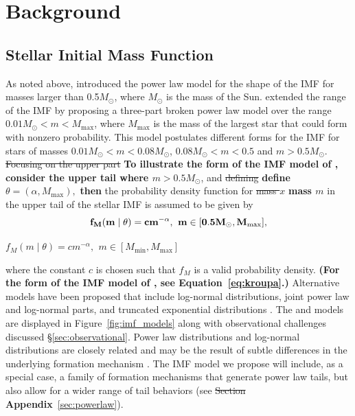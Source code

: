 \documentclass[ejs]{imsart}
\numberwithin{equation}{section}
\theoremstyle{plain}
\newcommand{\new}[1]{{\bf #1}}
\newcommand{\remove}[1]{\st{#1}}
\newcommand{\Msun}{M_{\odot}}
\newcommand{\Mmax}{M_{\text{max}}}
\newcommand{\Mmin}{M_{\text{min}}}
\begin{document}
\section{Background}
\label{sec:background}
\subsection{Stellar Initial Mass Function}

As noted above, \cite{salpeter55} introduced the power law model for the shape of the IMF for masses larger
than 0.5$\Msun$, where $\Msun$ is the mass of the Sun.
\cite{kroupa2001} extended the range of the IMF by proposing a three-part broken power law model 
over the range $0.01 \Msun < m < \Mmax$, where $\Mmax$ is the mass of the largest star that could form with nonzero probability.
This model postulates different forms for the IMF for stars of masses $0.01 \Msun < m < 0.08 \Msun$,
$0.08 \Msun < m < 0.5$ and $m > 0.5\Msun$.
\remove{Focusing on the upper part} \new{To illustrate the form of the IMF model of \cite{salpeter55}, consider the upper tail where $m > 0.5\Msun$}, and \remove{defining} \new{define} $\theta = (\alpha, \Mmax),$ \new{then} the probability density function for \remove{mass $x$} \new{ mass $m$} in the upper tail of the stellar IMF is assumed to be given by
\begin{align}
{\bf	f_M(m \mid \theta) = cm^{-\alpha}\text{,}\;\; m \in [0.5\Msun, \Mmax]\text{,}}
	\label{eq:imf}
\end{align}

\remove{$f_M(m \mid \theta) = cm^{-\alpha}\text{,}\;\; m \in [\Mmin, \Mmax]$}

\noindent where the constant $c$ is chosen such that $f_M$ is a valid probability density.  
\new{(For the form of the IMF model of \cite{kroupa2001}, see Equation~\eqref{eq:kroupa}.)}
Alternative models have been proposed that include log-normal distributions, joint power law and log-normal parts, and truncated exponential distributions  \citep{Chabrier:2003oq, Chabrier:2003om, chabrier2005,IMF50,bastian2010, OffnerEtAl2014}.  The \cite{kroupa2001} and \cite{Chabrier:2003oq, Chabrier:2003om} models are displayed in Figure~\ref{fig:imf_models} along with observational challenges discussed \S\ref{sec:observational}.
Power law distributions and log-normal distributions are closely related and may be the result of subtle differences in the underlying formation mechanism \citep{Mitzenmacher2004}.  
The IMF model we propose will include, as a special case, a family of formation mechanisms that generate
power law tails, but also allow for a wider range of tail behaviors (see \remove{Section} \new{Appendix}~\ref{sec:powerlaw}).
\end{document}
